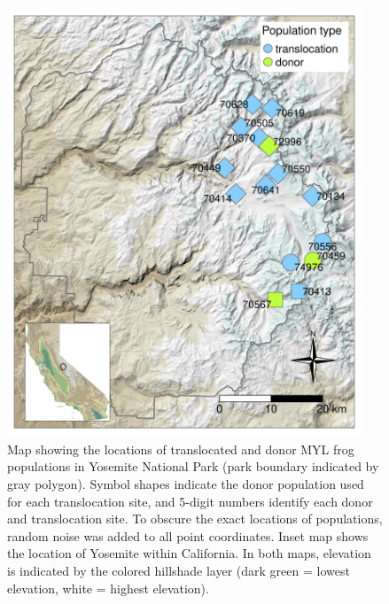 \documentclass[
  letterpaper,
  DIV=11,
  numbers=noendperiod]{scrartcl}
\begin{document}
\begin{figure}

{\centering \includegraphics[width=4.16667in,height=\textheight]{figures/map_translocation_points.png}

}

\caption{\label{fig-yosemap}Map showing the locations of translocated
and donor MYL frog populations in Yosemite National Park (park boundary
indicated by gray polygon). Symbol shapes indicate the donor population
used for each translocation site, and 5-digit numbers identify each
donor and translocation site. To obscure the exact locations of
populations, random noise was added to all point coordinates. Inset map
shows the location of Yosemite within California. In both maps,
elevation is indicated by the colored hillshade layer (dark green =
lowest elevation, white = highest elevation).}

\end{figure}

\newpage
\end{document}

